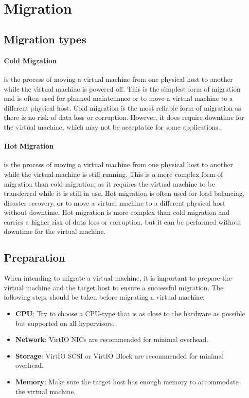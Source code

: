 \section{Migration}

\subsection{Migration types}

\paragraph{Cold Migration} is the process of moving a virtual machine from one physical host to another while the virtual machine is powered off. This is the simplest form of migration and is often used for planned maintenance or to move a virtual machine to a different physical host. Cold migration is the most reliable form of migration as there is no risk of data loss or corruption. However, it does require downtime for the virtual machine, which may not be acceptable for some applications.

\paragraph{Hot Migration} is the process of moving a virtual machine from one physical host to another while the virtual machine is still running. This is a more complex form of migration than cold migration, as it requires the virtual machine to be transferred while it is still in use. Hot migration is often used for load balancing, disaster recovery, or to move a virtual machine to a different physical host without downtime. Hot migration is more complex than cold migration and carries a higher risk of data loss or corruption, but it can be performed without downtime for the virtual machine.

\subsection{Preparation}

When intending to migrate a virtual machine, it is important to prepare the virtual machine and the target host to ensure a successful migration. The following steps should be taken before migrating a virtual machine:
\begin{itemize}
    \item \textbf{CPU}: Try to choose a CPU-type that is as close to the hardware as possible but supported on all hypervisors.
    \item \textbf{Network}: VirtIO NICs are recommended for minimal overhead.
    \item \textbf{Storage}: VirtIO SCSI or VirtIO Block are recommended for minimal overhead.
    \item \textbf{Memory}: Make sure the target host has enough memory to accommodate the virtual machine.
\end{itemize}


